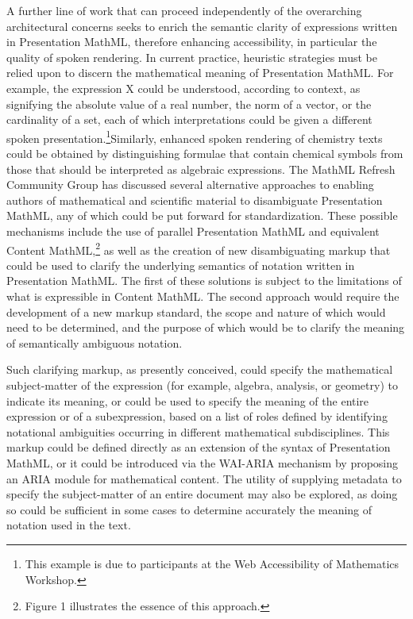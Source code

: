 \documentclass[11.5pt]{sig-alternate} %
\begin{document}
\begin{large}
A further line of work that can proceed independently of the overarching architectural concerns seeks to enrich the semantic clarity of expressions written in Presentation MathML, therefore enhancing accessibility, in particular the quality of spoken rendering. In current practice, heuristic strategies must be relied upon to discern the mathematical meaning of Presentation MathML. For example, the expression X could be understood, according to context, as signifying the absolute value of a real number, the norm of a vector, or the cardinality of a set, each of which interpretations could be given a different spoken presentation.\footnote{This example is due to participants at the Web Accessibility of Mathematics Workshop.}Similarly, enhanced spoken rendering of chemistry texts could be obtained by distinguishing formulae that contain chemical symbols from those that should be interpreted as algebraic expressions. The MathML Refresh Community Group has discussed several alternative approaches to enabling authors of mathematical and scientific material to disambiguate Presentation MathML, any of which could be put forward for standardization. These possible mechanisms include the use of parallel Presentation MathML and equivalent Content MathML,\footnote{Figure 1 illustrates the essence of this approach.} as well as the creation of new disambiguating markup that could be used to clarify the underlying semantics of notation written in Presentation MathML. The first of these solutions is subject to the limitations of what is expressible in Content MathML. The second approach would require the development of a new markup standard, the scope and nature of which would need to be determined, and the purpose of which would be to clarify the meaning of semantically ambiguous notation.

Such clarifying markup, as presently conceived, could specify the mathematical subject-matter of the expression (for example, algebra, analysis, or geometry) to indicate its meaning, or could be used to specify the meaning of the entire expression or of a subexpression, based on a list of roles defined by identifying notational ambiguities occurring in different mathematical subdisciplines. This markup could be defined directly as an extension of the syntax of Presentation MathML, or it could be introduced via the WAI-ARIA mechanism by proposing an ARIA module for mathematical content. The utility of supplying metadata to specify the subject-matter of an entire document may also be explored, as doing so could be sufficient in some cases to determine accurately the meaning of notation used in the text.


\end{large}
\end{document}
